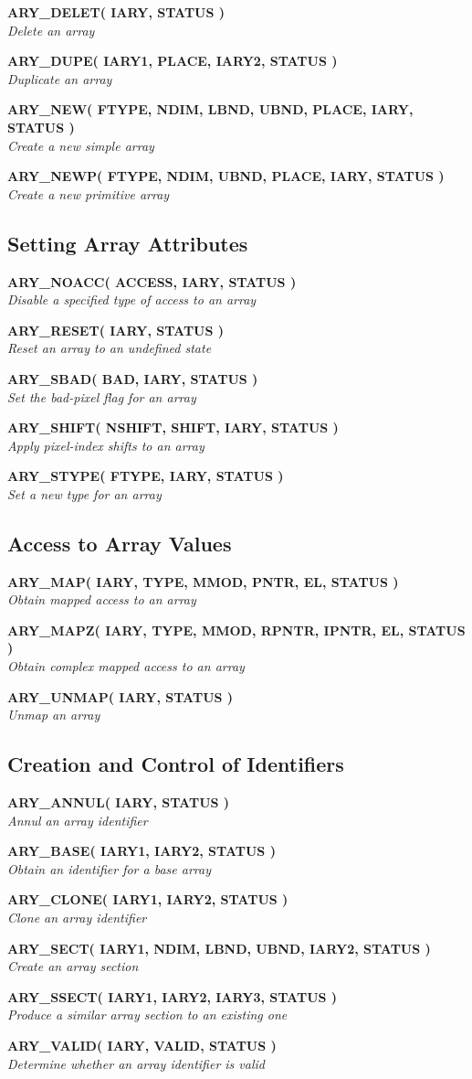 \documentclass[twoside,11pt]{article}
\newcommand{\xlabel}[1]{}
\newcommand{\noteroutine}[2]{\textbf{#1}\hspace*{\fill}\nopagebreak \\
                             \hspace*{3em}\emph{#2}\hspace*{\fill}\par}
\begin{document}
\begin{eqn*}
\noteroutine{ARY\_DELET( IARY, STATUS )}
            {Delete an array}
\noteroutine{ARY\_DUPE( IARY1, PLACE, IARY2, STATUS )}
            {Duplicate an array}
\noteroutine{ARY\_NEW( FTYPE, NDIM, LBND, UBND, PLACE, IARY, STATUS )}
            {Create a new simple array}
\noteroutine{ARY\_NEWP( FTYPE, NDIM, UBND, PLACE, IARY, STATUS )}
            {Create a new primitive array}


\subsection{\xlabel{setting_array_attributes}Setting Array Attributes}
\label{setting_array_attributes}

\noteroutine{ARY\_NOACC( ACCESS, IARY, STATUS )}
            {Disable a specified type of access to an array}
\noteroutine{ARY\_RESET( IARY, STATUS )}
            {Reset an array to an undefined state}
\noteroutine{ARY\_SBAD( BAD, IARY, STATUS )}
            {Set the bad-pixel flag for an array}
\noteroutine{ARY\_SHIFT( NSHIFT, SHIFT, IARY, STATUS )}
            {Apply pixel-index shifts to an array}
\noteroutine{ARY\_STYPE( FTYPE, IARY, STATUS )}
            {Set a new type for an array}


\subsection{\xlabel{access_to_array_values}Access to Array Values}
\label{access_to_array_values}

\noteroutine{ARY\_MAP( IARY, TYPE, MMOD, PNTR, EL, STATUS )}
            {Obtain mapped access to an array}
\noteroutine{ARY\_MAPZ( IARY, TYPE, MMOD, RPNTR, IPNTR, EL, STATUS )}
            {Obtain complex mapped access to an array}
\noteroutine{ARY\_UNMAP( IARY, STATUS )}
            {Unmap an array}


\subsection{\xlabel{creation_and_control_of_identifiers}%
Creation and Control of Identifiers}
\label{creation_and_control_of_identifiers}

\noteroutine{ARY\_ANNUL( IARY, STATUS )}
            {Annul an array identifier}
\noteroutine{ARY\_BASE( IARY1, IARY2, STATUS )}
            {Obtain an identifier for a base array}
\noteroutine{ARY\_CLONE( IARY1, IARY2, STATUS )}
            {Clone an array identifier}
\noteroutine{ARY\_SECT( IARY1, NDIM, LBND, UBND, IARY2, STATUS )}
            {Create an array section}
\noteroutine{ARY\_SSECT( IARY1, IARY2, IARY3, STATUS )}
            {Produce a similar array section to an existing one}
\noteroutine{ARY\_VALID( IARY, VALID, STATUS )}
            {Determine whether an array identifier is valid}



\end{eqn*}
\end{document}
